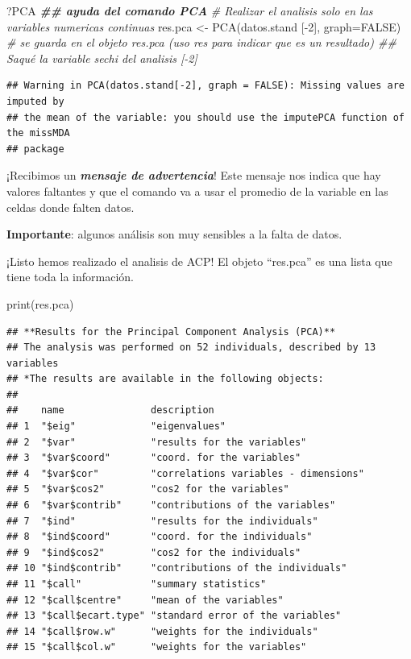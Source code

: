 \documentclass[
]{book}
\newenvironment{Shaded}{\begin{snugshade}}{\end{snugshade}}
\newcommand{\AttributeTok}[1]{\textcolor[rgb]{0.77,0.63,0.00}{#1}}
\newcommand{\CommentTok}[1]{\textcolor[rgb]{0.56,0.35,0.01}{\textit{#1}}}
\newcommand{\ConstantTok}[1]{\textcolor[rgb]{0.00,0.00,0.00}{#1}}
\newcommand{\DecValTok}[1]{\textcolor[rgb]{0.00,0.00,0.81}{#1}}
\newcommand{\DocumentationTok}[1]{\textcolor[rgb]{0.56,0.35,0.01}{\textbf{\textit{#1}}}}
\newcommand{\FunctionTok}[1]{\textcolor[rgb]{0.00,0.00,0.00}{#1}}
\newcommand{\NormalTok}[1]{#1}
\newcommand{\OtherTok}[1]{\textcolor[rgb]{0.56,0.35,0.01}{#1}}
\newcommand{\SpecialCharTok}[1]{\textcolor[rgb]{0.00,0.00,0.00}{#1}}
\begin{document}
\begin{Shaded}
\begin{Highlighting}[]
\NormalTok{?PCA }\DocumentationTok{\#\# ayuda del comando PCA}
\CommentTok{\# Realizar el analisis solo en las variables numericas continuas}
\NormalTok{res.pca }\OtherTok{\textless{}{-}} \FunctionTok{PCA}\NormalTok{(datos.stand [}\SpecialCharTok{{-}}\DecValTok{2}\NormalTok{], }\AttributeTok{graph=}\ConstantTok{FALSE}\NormalTok{) }\CommentTok{\# se guarda en el objeto res.pca (uso res para indicar que es un resultado) \#\# Saqué la variable sechi del analisis [{-}2]}
\end{Highlighting}
\end{Shaded}

\begin{verbatim}
## Warning in PCA(datos.stand[-2], graph = FALSE): Missing values are imputed by
## the mean of the variable: you should use the imputePCA function of the missMDA
## package
\end{verbatim}

¡Recibimos un \textbf{\emph{mensaje de advertencia}}! Este mensaje nos indica que hay valores faltantes y que el comando va a usar el promedio de la variable en las celdas donde falten datos.

\textbf{Importante}: algunos análisis son muy sensibles a la falta de datos.

¡Listo hemos realizado el analisis de ACP! El objeto ``res.pca'' es una lista que tiene toda la información.

\begin{Shaded}
\begin{Highlighting}[]
\FunctionTok{print}\NormalTok{(res.pca)}
\end{Highlighting}
\end{Shaded}

\begin{verbatim}
## **Results for the Principal Component Analysis (PCA)**
## The analysis was performed on 52 individuals, described by 13 variables
## *The results are available in the following objects:
## 
##    name               description                          
## 1  "$eig"             "eigenvalues"                        
## 2  "$var"             "results for the variables"          
## 3  "$var$coord"       "coord. for the variables"           
## 4  "$var$cor"         "correlations variables - dimensions"
## 5  "$var$cos2"        "cos2 for the variables"             
## 6  "$var$contrib"     "contributions of the variables"     
## 7  "$ind"             "results for the individuals"        
## 8  "$ind$coord"       "coord. for the individuals"         
## 9  "$ind$cos2"        "cos2 for the individuals"           
## 10 "$ind$contrib"     "contributions of the individuals"   
## 11 "$call"            "summary statistics"                 
## 12 "$call$centre"     "mean of the variables"              
## 13 "$call$ecart.type" "standard error of the variables"    
## 14 "$call$row.w"      "weights for the individuals"        
## 15 "$call$col.w"      "weights for the variables"
\end{verbatim}
\end{document}
